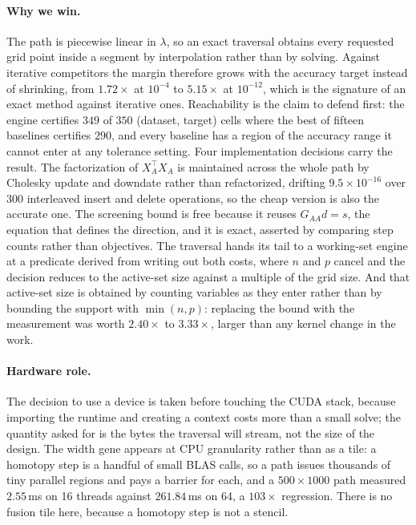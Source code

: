 \documentclass[11pt]{article}
\begin{document}
\paragraph{Why we win.} The path is piecewise linear in $\lambda$, so an exact
traversal obtains every requested grid point inside a segment by interpolation
rather than by solving. Against iterative competitors the margin therefore grows
with the accuracy target instead of shrinking, from $1.72\times$ at $10^{-4}$ to
$5.15\times$ at $10^{-12}$, which is the signature of an exact method against
iterative ones. Reachability is the claim to defend first: the engine certifies
$349$ of $350$ (dataset, target) cells where the best of fifteen baselines
certifies $290$, and every baseline has a region of the accuracy range it cannot
enter at any tolerance setting. Four implementation decisions carry the result.
The factorization of $X_A^\top X_A$ is maintained across the whole path by
Cholesky update and downdate rather than refactorized, drifting
$9.5\times10^{-16}$ over 300 interleaved insert and delete operations, so the
cheap version is also the accurate one. The screening bound is free because it
reuses $G_{AA}d = s$, the equation that defines the direction, and it is exact,
asserted by comparing step counts rather than objectives. The traversal hands
its tail to a working-set engine at a predicate derived from writing out both
costs, where $n$ and $p$ cancel and the decision reduces to the active-set size
against a multiple of the grid size. And that active-set size is obtained by
counting variables as they enter rather than by bounding the support with
$\min(n,p)$: replacing the bound with the measurement was worth $2.40\times$ to
$3.33\times$, larger than any kernel change in the work.

\paragraph{Hardware role.} The decision to use a device is taken before touching
the CUDA stack, because importing the runtime and creating a context costs more
than a small solve; the quantity asked for is the bytes the traversal will
stream, not the size of the design. The width gene appears at CPU granularity
rather than as a tile: a homotopy step is a handful of small BLAS calls, so a
path issues thousands of tiny parallel regions and pays a barrier for each, and
a $500 \times 1000$ path measured $2.55$\,ms on 16 threads against
$261.84$\,ms on 64, a $103\times$ regression. There is no fusion tile here,
because a homotopy step is not a stencil.
\end{document}
